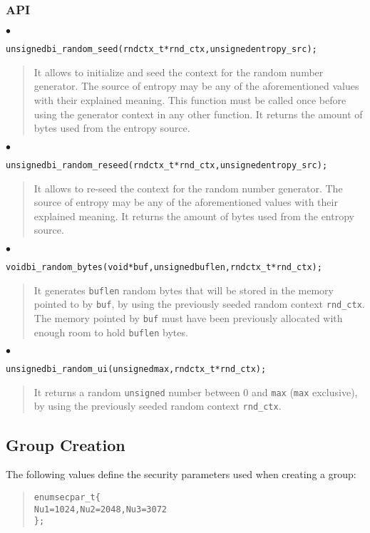\documentclass[a4paper]{article}
\newenvironment{code}%
{\begin{quote}\footnotesize\begin{alltt}}%
{\end{alltt}\end{quote}}%
\newenvironment{api}%
{\noindent$\bullet$\hfill\begin{minipage}[t]{0.97\linewidth}\footnotesize\begin{alltt}}%
{\end{alltt}\end{minipage}}%
\begin{document}
\subsubsection*{API}
\begin{api}
unsigned bi_random_seed(rndctx_t* rnd_ctx, unsigned entropy_src);
\end{api}
\begin{quote}\footnotesize
It allows to initialize and seed the context for the random number
generator. The source of entropy may be any of the aforementioned
values with their explained meaning. This function must be called once
before using the generator context in any other function. It returns
the amount of bytes used from the entropy source.
\end{quote}
\begin{api}
unsigned bi_random_reseed(rndctx_t* rnd_ctx, unsigned entropy_src);
\end{api}
\begin{quote}\footnotesize
It allows to re-seed the context for the random number
generator. The source of entropy may be any of the aforementioned
values with their explained meaning. It returns
the amount of bytes used from the entropy source.
\end{quote}
\begin{api}
void bi_random_bytes(void* buf, unsigned buflen, rndctx_t* rnd_ctx);
\end{api}
\begin{quote}\footnotesize
It generates \verb|buflen| random bytes that will be stored in the
memory pointed to by \verb|buf|, by using the previously seeded random
context \verb|rnd_ctx|. The memory pointed by \verb|buf| must have
been previously allocated with enough room to hold \verb|buflen| bytes.
\end{quote}
\begin{api}
unsigned bi_random_ui(unsigned max, rndctx_t* rnd_ctx);
\end{api}
\begin{quote}\footnotesize
It returns a random \verb|unsigned| number between 0 and \verb|max|
(\verb|max| exclusive), by using the previously seeded random context
\verb|rnd_ctx|.
\end{quote}

\subsection{Group Creation}
The following values define the security parameters used when creating
a group:
\begin{code}
enum secpar_t \{
    Nu1 = 1024, Nu2 = 2048, Nu3 = 3072
\};
\end{code}
\end{document}
